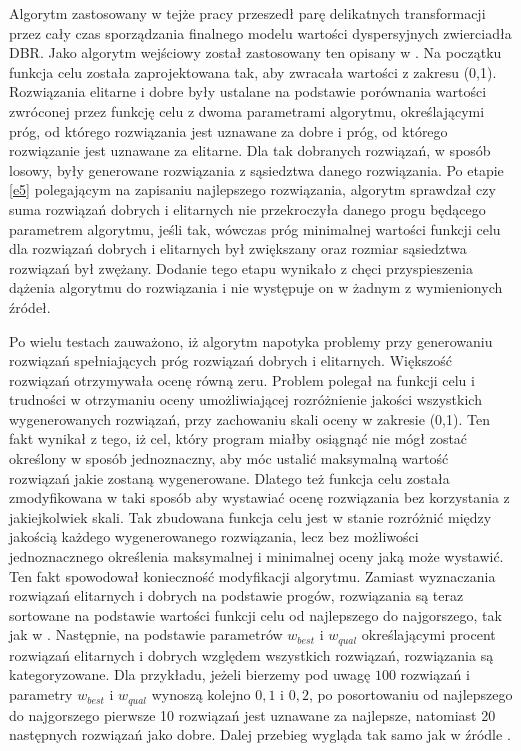 Algorytm zastosowany w tejże pracy przeszedł parę delikatnych transformacji przez cały czas sporządzania finalnego modelu wartości dyspersyjnych zwierciadła DBR. Jako algorytm wejściowy został zastosowany ten opisany w \cite{algroj}. Na początku funkcja celu została zaprojektowana tak, aby zwracała wartości z zakresu (0,1). Rozwiązania elitarne i dobre były ustalane na podstawie porównania wartości zwróconej przez funkcję celu z dwoma parametrami algorytmu, określającymi próg, od którego rozwiązania jest uznawane za dobre i próg, od którego rozwiązanie jest uznawane za elitarne. Dla tak dobranych rozwiązań, w sposób losowy, były generowane rozwiązania z sąsiedztwa danego rozwiązania. Po etapie \ref{e5} polegającym na zapisaniu najlepszego rozwiązania, algorytm sprawdzał czy suma rozwiązań dobrych i elitarnych nie przekroczyła danego progu będącego parametrem algorytmu, jeśli tak, wówczas próg minimalnej wartości funkcji celu dla rozwiązań dobrych i elitarnych był zwiększany oraz rozmiar sąsiedztwa rozwiązań był zwężany. Dodanie tego etapu wynikało z chęci przyspieszenia dążenia algorytmu do rozwiązania i nie występuje on w żadnym z wymienionych źródeł.

Po wielu testach zauważono, iż algorytm napotyka problemy przy generowaniu rozwiązań spełniających próg rozwiązań dobrych i elitarnych. Większość rozwiązań otrzymywała ocenę równą zeru. Problem polegał na funkcji celu i trudności w otrzymaniu oceny umożliwiającej rozróżnienie jakości wszystkich wygenerowanych rozwiązań, przy zachowaniu skali oceny w zakresie (0,1). Ten fakt wynikał z tego, iż cel, który program miałby osiągnąć nie mógł zostać określony w sposób jednoznaczny, aby móc ustalić maksymalną wartość rozwiązań jakie zostaną wygenerowane. Dlatego też funkcja celu została zmodyfikowana w taki sposób aby wystawiać ocenę rozwiązania bez korzystania z jakiejkolwiek skali. Tak zbudowana funkcja celu jest w stanie rozróżnić między jakością każdego wygenerowanego rozwiązania, lecz bez możliwości jednoznacznego określenia maksymalnej i minimalnej oceny jaką może wystawić. Ten fakt spowodował konieczność modyfikacji algorytmu. Zamiast wyznaczania rozwiązań elitarnych i dobrych na podstawie progów, rozwiązania są teraz sortowane na podstawie wartości funkcji celu od najlepszego do najgorszego, tak jak w \cite{algroj3}. Następnie, na podstawie parametrów $w_{best}$ i $w_{qual}$ określającymi procent rozwiązań elitarnych i dobrych względem wszystkich rozwiązań, rozwiązania są kategoryzowane. Dla przykładu, jeżeli bierzemy pod uwagę $100$ rozwiązań i parametry $w_{best}$ i $w_{qual}$ wynoszą kolejno $0,1$ i $0,2$, po posortowaniu od najlepszego do najgorszego pierwsze 10 rozwiązań jest uznawane za najlepsze, natomiast 20 następnych rozwiązań jako dobre. Dalej przebieg wygląda tak samo jak w źródle \cite{algroj}.

